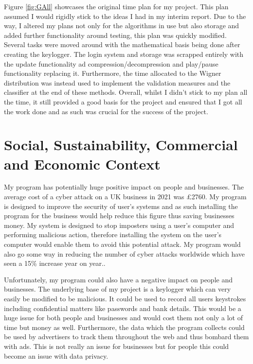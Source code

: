 \documentclass[10pt,a4paper]{report}
\begin{document}
Figure \ref{fig:GAll} showcases the original time plan for my project. This plan assumed I would rigidly stick to the ideas I had in my interim report. Due to the way, I altered my plans not only for the algorithms in use but also storage and added further functionality around testing, this plan was quickly modified. Several tasks were moved around with the mathematical basis being done after creating the keylogger. The login system and storage was scrapped entirely with the update functionality ad compression/decompression and play/pause functionality replacing it. Furthermore, the time allocated to the Wigner distribution was instead used to implement the validation measures and the classifier at the end of these methods. Overall, whilst I didn't stick to my plan all the time, it still provided a good basis for the project and ensured that I got all the work done and as such was crucial for the success of the project.

\section{Social, Sustainability, Commercial and Economic Context}

My program has potentially huge positive impact on people and businesses. The average cost of a cyber attack on a UK business in 2021 was £2760\cite{o'dea_2022}. My program is designed to improve the security of user's systems and as such installing the program for the business would help reduce this figure thus saving businesses money. My system is designed to stop imposters using a user's computer and performing malicious action, therefore installing the system on the user's computer would enable them to avoid this potential attack. My program would also go some way in reducing the number of cyber attacks worldwide which have seen a 15\% increase year on year.\cite{karafiloski_2021}. 

Unfortunately, my program could also have a negative impact on people and businesses. The underlying base of my project is a keylogger which can very easily be modified to be malicious. It could be used to record all users keystrokes including confidential matters like passwords and bank details. This would be a huge issue for both people and businesses and would cost them not only a lot of time but money as well. Furthermore, the data which the program collects could be used by advertisers to track them throughout the web and thus bombard them with ads. This is not really an issue for businesses but for people this could become an issue with data privacy. 
\end{document}
